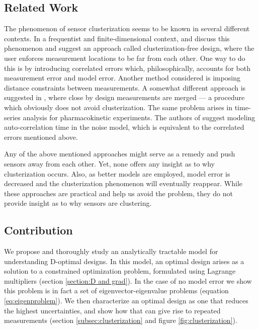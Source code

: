 \documentclass{amsart}
\numberwithin{equation}{section}
\begin{document}
\subsection{Related Work}
The phenomenon of sensor clusterization seems to be known in several
different contexts. In a frequentist and finite-dimensional context,
\cite{Fedorov96} and \cite[chapter 2.4.3]{Ucinski05} discuss this
phenomenon and suggest an approach called clusterization-free design,
where the user enforces measurement locations to be far from each
other. One way to do this is by introducing correlated errors which,
philosophically, accounts for both measurement error and model error.
Another method considered is imposing distance constraints between
measurements. A somewhat different approach is suggested in \cite[page
  49]{Fedorov12}, where close by design measurements are merged --- a
procedure which obviously does not avoid clusterization. The same problem
arises in time-series analysis for pharmacokinetic experiments. The
authors of \cite{Hooker09} suggest modeling auto-correlation time in
the noise model, which is equivalent to the correlated errors
mentioned above.

Any of the above mentioned approaches might serve as a remedy and push
sensors away from each other. Yet, none offers any insight as to why
clusterization occurs. Also, as better models are employed, model
error is decreased and the clusterization phenomenon will eventually
reappear. While these approaches are practical and help us avoid the
problem, they do not provide insight as to why sensors are clustering.

\subsection{Contribution}
We propose and thoroughly study an analytically tractable model for
understanding D-optimal designs. In this model, an optimal design
arises as a solution to a constrained optimization problem, formulated
using Lagrange multipliers (section \ref{section:D and grad}). In the
case of no model error we show this problem is in fact a set of
eigenvector-eigenvalue problems (equation \eqref{eq:eigenproblem}). We
then characterize an optimal design as one that reduces the highest
uncertainties, and show how that can give rise to repeated
measurements (section \ref{subsec:clusterization} and figure
\ref{fig:clusterization}).
\end{document}
